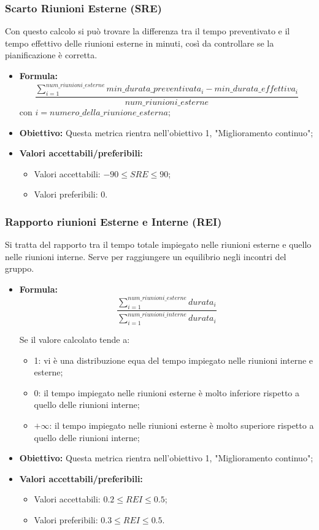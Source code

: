 \subsubsection{Scarto Riunioni Esterne (SRE)}
	Con questo calcolo si può trovare la differenza tra il tempo preventivato e il tempo effettivo delle riunioni esterne in minuti, così da controllare se la pianificazione è corretta.
\begin{itemize}
	\item{\textbf{Formula:}}\[\frac{\sum_{i=1}^{num\_riunioni\_esterne}min\_durata\_preventivata_i-min\_durata\_effettiva_i}{num\_riunioni\_esterne}\]
	con $i = {numero\_della\_riunione\_esterna}$;
	\item {\textbf{Obiettivo: }}Questa metrica rientra nell'obiettivo 1, "Miglioramento continuo";
	\item {\textbf{Valori accettabili/preferibili: }}
		\begin{itemize}
			\item Valori accettabili: $-90 \leq SRE \leq 90$;
			\item Valori preferibili: 0.
		\end{itemize}
\end{itemize}

\subsubsection{Rapporto riunioni Esterne e Interne (REI)}
	Si tratta del rapporto tra il tempo totale impiegato nelle riunioni esterne e quello nelle riunioni interne. Serve per raggiungere un equilibrio negli incontri del gruppo.
\begin{itemize}
	\item {\textbf{Formula: }}\[\frac{\sum_{i=1}^{num\_riunioni\_esterne} durata_i}{\sum_{i=1}^{num\_riunioni\_interne} durata_i}\]

	Se il valore calcolato tende a:
	\begin{itemize}
		\item 1: vi è una distribuzione equa del tempo impiegato nelle riunioni interne e esterne;
		\item 0: il tempo impiegato nelle riunioni esterne è molto inferiore rispetto a quello delle riunioni interne;
		\item $+\infty$: il tempo impiegato nelle riunioni esterne è molto superiore rispetto a quello delle riunioni interne;
	\end{itemize}
	\item {\textbf{Obiettivo: }}Questa metrica rientra nell'obiettivo 1, "Miglioramento continuo";
	\item {\textbf{Valori accettabili/preferibili: }}
	\begin{itemize}
		\item Valori accettabili: $0.2 \leq REI \leq 0.5$;
		\item Valori preferibili: $0.3 \leq REI \leq 0.5$.
	\end{itemize}
\end{itemize}

